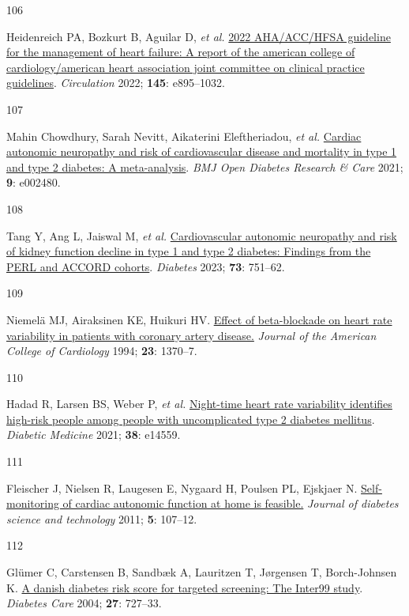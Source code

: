 \documentclass[
  a4paper,
  headsepline=true,
  open=any]{scrbook}
\newlength{\cslhangindent}
\newlength{\csllabelwidth}
\newlength{\cslentryspacingunit} %
\newenvironment{CSLReferences}[2] %
 {%
  \setlength{\parindent}{0pt}
  \ifodd #1
  \let\oldpar\par
  \def\par{\hangindent=\cslhangindent\oldpar}
  \fi
  \setlength{\parskip}{#2\cslentryspacingunit}
 }%
 {}
\newcommand{\CSLLeftMargin}[1]{\parbox[t]{\csllabelwidth}{#1}}
\newcommand{\CSLRightInline}[1]{\parbox[t]{\linewidth - \csllabelwidth}{#1}\break}
\begin{document}
\begin{CSLReferences}{0}{0}
\leavevmode{}%
\CSLLeftMargin{106 }%
\CSLRightInline{Heidenreich PA, Bozkurt B, Aguilar D, \emph{et al.}
\href{https://doi.org/10.1161/CIR.0000000000001063}{2022 AHA/ACC/HFSA
guideline for the management of heart failure: A report of the american
college of cardiology/american heart association joint committee on
clinical practice guidelines}. \emph{Circulation} 2022; \textbf{145}:
e895--1032.}

\leavevmode{}%
\CSLLeftMargin{107 }%
\CSLRightInline{Mahin Chowdhury, Sarah Nevitt, Aikaterini Eleftheriadou,
\emph{et al.} \href{https://doi.org/10.1136/bmjdrc-2021-002480}{Cardiac
autonomic neuropathy and risk of cardiovascular disease and mortality in
type 1 and type 2 diabetes: A meta-analysis}. \emph{BMJ Open Diabetes
Research \& Care} 2021; \textbf{9}: e002480.}

\leavevmode{}%
\CSLLeftMargin{108 }%
\CSLRightInline{Tang Y, Ang L, Jaiswal M, \emph{et al.}
\href{https://doi.org/10.2337/db23-0247}{Cardiovascular autonomic
neuropathy and risk of kidney function decline in type 1 and type 2
diabetes: Findings from the PERL and ACCORD cohorts}. \emph{Diabetes}
2023; \textbf{73}: 751--62.}

\leavevmode{}%
\CSLLeftMargin{109 }%
\CSLRightInline{Niemelä MJ, Airaksinen KE, Huikuri HV.
\href{https://doi.org/10.1016/0735-1097(94)90379-4}{Effect of
beta-blockade on heart rate variability in patients with coronary artery
disease.} \emph{Journal of the American College of Cardiology} 1994;
\textbf{23}: 1370--7.}

\leavevmode{}%
\CSLLeftMargin{110 }%
\CSLRightInline{Hadad R, Larsen BS, Weber P, \emph{et al.}
\href{https://doi.org/10.1111/dme.14559}{Night-time heart rate
variability identifies high-risk people among people with uncomplicated
type 2 diabetes mellitus}. \emph{Diabetic Medicine} 2021; \textbf{38}:
e14559.}

\leavevmode{}%
\CSLLeftMargin{111 }%
\CSLRightInline{Fleischer J, Nielsen R, Laugesen E, Nygaard H, Poulsen
PL, Ejskjaer N.
\href{https://doi.org/10.1177/193229681100500115}{Self-monitoring of
cardiac autonomic function at home is feasible.} \emph{Journal of
diabetes science and technology} 2011; \textbf{5}: 107--12.}

\leavevmode{}%
\CSLLeftMargin{112 }%
\CSLRightInline{Glümer C, Carstensen B, Sandbæk A, Lauritzen T,
Jørgensen T, Borch-Johnsen K.
\href{https://doi.org/10.2337/diacare.27.3.727}{A danish diabetes risk
score for targeted screening: The Inter99 study}. \emph{Diabetes Care}
2004; \textbf{27}: 727--33.}


\end{CSLReferences}
\end{document}
